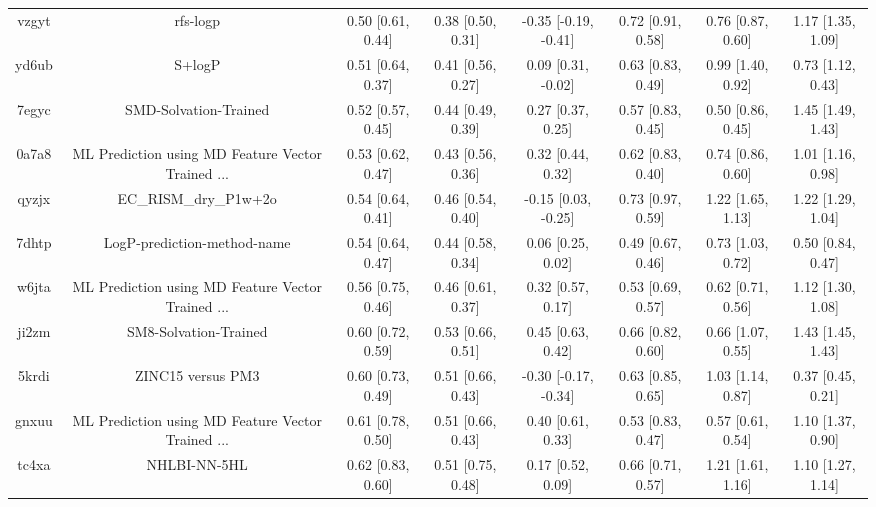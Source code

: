\documentclass{article}
\begin{document}
\begin{center}
\begin{longtable}{|cccccccc|}
 vzgyt &                                           rfs-logp &  0.50 [0.61, 0.44] &  0.38 [0.50, 0.31] &  -0.35 [-0.19, -0.41] &  0.72 [0.91, 0.58] &     0.76 [0.87, 0.60] &     1.17 [1.35, 1.09] \\
 yd6ub &                                             S+logP &  0.51 [0.64, 0.37] &  0.41 [0.56, 0.27] &    0.09 [0.31, -0.02] &  0.63 [0.83, 0.49] &     0.99 [1.40, 0.92] &     0.73 [1.12, 0.43] \\
 7egyc &                              SMD-Solvation-Trained &  0.52 [0.57, 0.45] &  0.44 [0.49, 0.39] &     0.27 [0.37, 0.25] &  0.57 [0.83, 0.45] &     0.50 [0.86, 0.45] &     1.45 [1.49, 1.43] \\
 0a7a8 &  ML Prediction using MD Feature Vector Trained ... &  0.53 [0.62, 0.47] &  0.43 [0.56, 0.36] &     0.32 [0.44, 0.32] &  0.62 [0.83, 0.40] &     0.74 [0.86, 0.60] &     1.01 [1.16, 0.98] \\
 qyzjx &                              EC\_RISM\_dry\_P1w+2o &  0.54 [0.64, 0.41] &  0.46 [0.54, 0.40] &   -0.15 [0.03, -0.25] &  0.73 [0.97, 0.59] &     1.22 [1.65, 1.13] &     1.22 [1.29, 1.04] \\
 7dhtp &                        LogP-prediction-method-name &  0.54 [0.64, 0.47] &  0.44 [0.58, 0.34] &     0.06 [0.25, 0.02] &  0.49 [0.67, 0.46] &     0.73 [1.03, 0.72] &     0.50 [0.84, 0.47] \\
 w6jta &  ML Prediction using MD Feature Vector Trained ... &  0.56 [0.75, 0.46] &  0.46 [0.61, 0.37] &     0.32 [0.57, 0.17] &  0.53 [0.69, 0.57] &     0.62 [0.71, 0.56] &     1.12 [1.30, 1.08] \\
 ji2zm &                              SM8-Solvation-Trained &  0.60 [0.72, 0.59] &  0.53 [0.66, 0.51] &     0.45 [0.63, 0.42] &  0.66 [0.82, 0.60] &     0.66 [1.07, 0.55] &     1.43 [1.45, 1.43] \\
 5krdi &                                  ZINC15 versus PM3 &  0.60 [0.73, 0.49] &  0.51 [0.66, 0.43] &  -0.30 [-0.17, -0.34] &  0.63 [0.85, 0.65] &     1.03 [1.14, 0.87] &     0.37 [0.45, 0.21] \\
 gnxuu &  ML Prediction using MD Feature Vector Trained ... &  0.61 [0.78, 0.50] &  0.51 [0.66, 0.43] &     0.40 [0.61, 0.33] &  0.53 [0.83, 0.47] &     0.57 [0.61, 0.54] &     1.10 [1.37, 0.90] \\
 tc4xa &                                       NHLBI-NN-5HL &  0.62 [0.83, 0.60] &  0.51 [0.75, 0.48] &     0.17 [0.52, 0.09] &  0.66 [0.71, 0.57] &     1.21 [1.61, 1.16] &     1.10 [1.27, 1.14] \\

\end{longtable}
\end{center}
\end{document}
